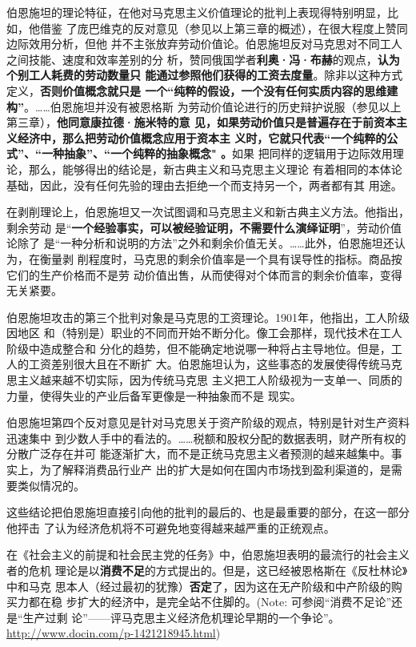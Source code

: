 伯恩施坦的理论特征，在他对马克思主义价值理论的批判上表现得特别明显，比如，他借鉴
了庞巴维克的反对意见（参见以上第三章的概述），在很大程度上赞同边际效用分析，但他
并不主张放弃劳动价值论。伯恩施坦反对马克思对不同工人之间技能、速度和效率差别的分
析，赞同俄国学者\textbf{利奥·冯·布赫}的观点，\textbf{认为个别工人耗费的劳动数量只
  能通过参照他们获得的工资去度量}。除非以这种方式定义，\textbf{否则价值概念就只是
  一个“纯粹的假设，一个没有任何实质内容的思维建构”}。……伯恩施坦并没有被恩格斯
为劳动价值论进行的历史辩护说服（参见以上第三章），\textbf{他同意康拉德·施米特的意
  见，如果劳动价值只是普遍存在于前资本主义经济中，那么把劳动价值概念应用于资本主
  义时，它就只代表“一个纯粹的公式”、“一种抽象”、“一个纯粹的抽象概念" 。}如果
把同样的逻辑用于边际效用理论，那么，能够得出的结论是，新古典主义和马克思主义理论
有着相同的本体论基础，因此，没有任何先验的理由去拒绝一个而支持另一个，两者都有其
用途。

在剥削理论上，伯恩施坦又一次试图调和马克思主义和新古典主义方法。他指出，剩余劳动
是“\textbf{一个经验事实，可以被经验证明，不需要什么演绎证明}”，劳动价值论除了
是“一种分析和说明的方法”之外和剩余价值无关。……此外，伯恩施坦还认为，在衡量剥
削程度时，马克思的剩余价值率是一个具有误导性的指标。商品按它们的生产价格而不是劳
动价值出售，从而使得对个体而言的剩余价值率，变得无关紧要。

伯恩施坦攻击的第三个批判对象是马克思的工资理论。1901年，他指出，工人阶级因地区
和（特别是）职业的不同而开始不断分化。像工会那样，现代技术在工人阶级中造成整合和
分化的趋势，但不能确定地说哪一种将占主导地位。但是，工人的工资差别很大且在不断扩
大。伯恩施坦认为，这些事态的发展使得传统马克思主义越来越不切实际，因为传统马克思
主义把工人阶级视为一支单一、同质的力量，使得失业的产业后备军更像是一种抽象而不是
现实。

伯恩施坦第四个反对意见是针对马克思关于资产阶级的观点，特别是针对生产资料迅速集中
到少数人手中的看法的。……税额和股权分配的数据表明，财产所有权的分散广泛存在并可
能逐渐扩大，而不是正统马克思主义者预测的越来越集中。事实上，为了解释消费品行业产
出的扩大是如何在国内市场找到盈利渠道的，是需要类似情况的。

这些结论把伯恩施坦直接引向他的批判的最后的、也是最重要的部分，在这一部分他抨击
了认为经济危机将不可避免地变得越来越严重的正统观点。

在《社会主义的前提和社会民主党的任务》中，伯恩施坦表明的最流行的社会主义者的危机
理论是以\textbf{消费不足}的方式提出的。但是，这已经被恩格斯在《反杜林论》中和马克
思本人（经过最初的犹豫）\textbf{否定}了，因为这在无产阶级和中产阶级的购买力都在稳
步扩大的经济中，是完全站不住脚的。(Note: 可参阅“消费不足论”还是“生产过剩
论”——评马克思主义经济危机理论早期的一个争论”。 \url{http://www.docin.com/p-1421218945.html})

